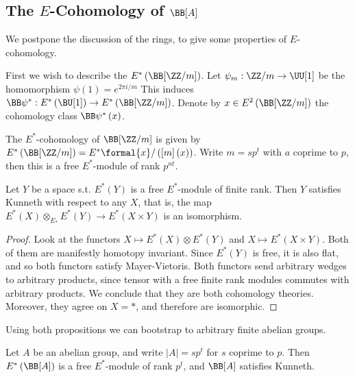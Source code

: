 \subsection{The \texorpdfstring{$E$}{E}-Cohomology of \texorpdfstring{$\BB[A]$}{BA}}

We postpone the discussion of the rings, to give some properties of $E$-cohomology.

First we wish to describe the $E^*\left(\BB[\ZZ/m]\right)$.
Let $\psi_m: \ZZ/m \to \UU[1]$ be the homomorphism $\psi\left(1\right) = e^{2\pi i/m}$
This induces $\BB\psi^*: E^*\left(\BU[1]\right) \to E^*\left(\BB[\ZZ/m]\right)$.
Denote by $x \in E^2\left(\BB[\ZZ/m]\right)$ the cohomology class $\BB\psi^*\left(x\right)$.

\begin{proposition}
	The $E^*$-cohomology of $\BB[\ZZ/m]$ is given by $E^*\left(\BB[\ZZ/m]\right) = E^*\formal{x} / \left(\left[m\right]\left(x\right)\right)$.
	Write $m = sp^t$ with $a$ coprime to $p$, then this is a free $E^*$-module of rank $p^{nt}$.
\end{proposition}

\begin{proposition}
	Let $Y$ be a space s.t. $E^*\left(Y\right)$ is a free $E^*$-module of finite rank.
	Then $Y$ satisfies Kunneth with respect to any $X$, that is, the map $E^*\left(X\right) \otimes_{E_*} E^*\left(Y\right) \to E^*\left(X \times Y\right)$ is an isomorphism.
\end{proposition}

\begin{proof}
	Look at the functors $X \mapsto E^*\left(X\right) \otimes E^*\left(Y\right)$ and $X \mapsto E^*\left(X \times Y\right)$.
	Both of them are manifestly homotopy invariant.
	Since $E^*\left(Y\right)$ is free, it is also flat, and so both functors satisfy Mayer-Vietoris.
	Both functors send arbitrary wedges to arbitrary products, since tensor with a free finite rank modules commutes with arbitrary products.
	We conclude that they are both cohomology theories.
	Moreover, they agree on $X = *$, and therefore are isomorphic.
\end{proof}

Using both propositions we can bootstrap to arbitrary finite abelian groups.

\begin{proposition}
	Let $A$ be an abelian group, and write $\left|A\right| = sp^t$ for $s$ coprime to $p$.
	Then $E^*\left(\BB[A]\right)$ is a free $E^*$-module of rank $p^t$, and $\BB[A]$ satisfies Kunneth.
\end{proposition}

